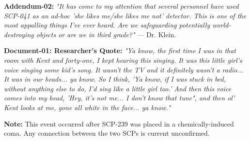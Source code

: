 \textbf{Addendum-02:} \textsl{"It has come to my attention that several personnel have used SCP-041 as an ad-hoc 'she likes me/she likes me not' detector. This is one of the most appalling things I've ever heard. Are we safeguarding potentially world-destroying objects or are we in third grade?"} — Dr. Klein.

\textbf{Document-01: Researcher's Quote:} \textsl{"Ya know, the first time I was in that room with Kent and forty-one, I kept hearing this singing. It was this little girl's voice singing some kid's song. It wasn't the TV and it definitely wasn't a radio... It was in our heads... ya know. So I think, 'Ya know, if I was stuck in bed, without anything else to do, I'd sing like a little girl too.' And then this voice comes into my head, 'Hey, it's not me... I don't know that tune", and then ol' Kent looks at me, gone all white in the face... ya know."}

\textbf{Note:} This event occurred after SCP-239 was placed in a chemically-induced coma. Any connection between the two SCPs is current unconfirmed.